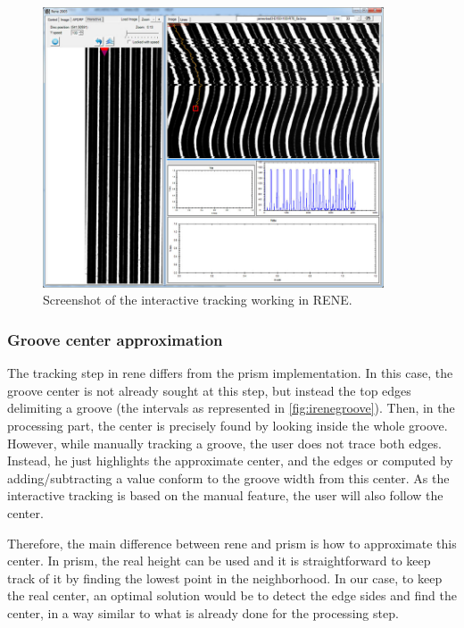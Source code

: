 \begin{figure}[!ht]
\centering
\includegraphics[width=0.9\textwidth]{images/int-tracking-rene}
\caption{Screenshot of the interactive tracking working in RENE.}
\label{fig:irenegui}
\end{figure}

\subsubsection{Groove center approximation}

The tracking step in \gls{rene} differs from the \gls{prism} implementation. In this case, the groove center is not already sought at this step, but instead the top edges delimiting a groove (the intervals as represented in \autoref{fig:irenegroove}). Then, in the processing part, the center is precisely found by looking inside the whole groove. However, while manually tracking a groove, the user does not trace both edges. Instead, he just highlights the approximate center, and the edges or computed by adding/subtracting a value conform to the groove width from this center. As the interactive tracking is based on the manual feature, the user will also follow the center.

Therefore, the main difference between \gls{rene} and \gls{prism} is how to approximate this center. In \gls{prism}, the real height can be used and it is straightforward to keep track of it by finding the lowest point in the neighborhood. In our case, to keep the real center, an optimal solution would be to detect the edge sides and find the center, in a way similar to what is already done for the processing step.


